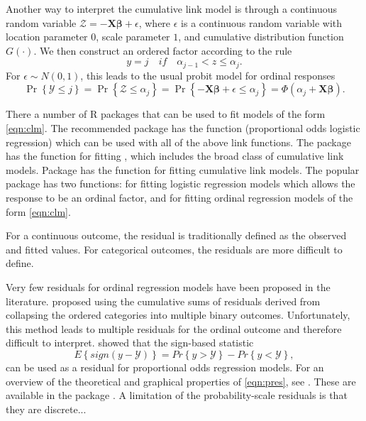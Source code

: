 Another way to interpret the cumulative link model is through a  continuous random variable $\mathcal{Z} = -\boldsymbol{X}\boldsymbol{\beta} + \epsilon$, where $\epsilon$ is a continuous random variable with location parameter $0$, scale parameter $1$, and cumulative distribution function $G\left(\cdot\right)$. We then construct an ordered factor according to the rule
\begin{equation*}
  y = j \quad if \quad \alpha_{j - 1} < z \le \alpha_j.
\end{equation*}
For $\epsilon \sim N\left(0, 1\right)$, this leads to the usual probit model for ordinal responses
\begin{equation*}
  \Pr\left\{\mathcal{Y} \le j\right\} = \Pr\left\{\mathcal{Z} \le \alpha_j\right\} = \Pr\left\{-\boldsymbol{X}\boldsymbol{\beta} + \epsilon \le \alpha_j\right\} = \Phi\left(\alpha_j + \boldsymbol{X}\boldsymbol{\beta}\right).
\end{equation*}

There a number of R packages that can be used to fit models of the form \eqref{eqn:clm}. The recommended package  \citep{pkg-MASS} has the function  (proportional odds logistic regression) which can be used with all of the above link functions. The  \citep{pkg-VGAM} package has the  function for fitting , which includes the broad class of cumulative link models. Package  \citep{pkg-ordinal} has the  function for fitting cumulative link models. The popular  package \citep{pkg-rms} has two functions:  for fitting logistic regression models which allows the response to be an ordinal factor, and  for fitting ordinal regression models of the form \eqref{eqn:clm}.

For a continuous outcome, the residual is traditionally defined as the observed and fitted values. For categorical outcomes, the residuals are more difficult to define.

Very few residuals for ordinal regression models have been proposed in the literature. \citet{graphical-liu-2009} proposed using the cumulative sums of residuals derived from collapsing the ordered categories into multiple binary outcomes. Unfortunately, this method leads to multiple residuals for the ordinal outcome and therefore difficult to interpret. \citet{residuals-li-2012} showed that the sign-based statistic
\begin{equation}
\label{eqn:pres}
  E\left\{sign\left(y - \mathcal{Y}\right)\right\} = Pr\left\{y > \mathcal{Y}\right\} - Pr\left\{y < \mathcal{Y}\right\},
\end{equation}
can be used as a residual for proportional odds regression models. For an overview of the theoretical and graphical properties of \eqref{eqn:pres}, see \citet{residuals-liu-2017}. These are available in the  package \citep{pkg-PResiduals}. A limitation of the probability-scale residuals is that they are discrete...


